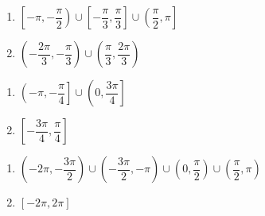 \documentclass{ximera}
\begin{document}
\begin{multicols}{2}

\begin{enumerate}

\setcounter{enumi}{\value{HW}}

\item $\left[ -\pi, -\dfrac{\pi}{2} \right) \cup \left[ -\dfrac{\pi}{3}, \dfrac{\pi}{3} \right] \cup \left( \dfrac{\pi}{2}, \pi \right]$ 
\item $\left( -\dfrac{2\pi}{3}, -\dfrac{\pi}{3} \right) \cup \left( \dfrac{\pi}{3}, \dfrac{2\pi}{3} \right)$

\setcounter{HW}{\value{enumi}}

\end{enumerate}

\end{multicols}

\begin{multicols}{2}

\begin{enumerate}

\setcounter{enumi}{\value{HW}}

\item $\left( -\pi, -\dfrac{\pi}{4} \right] \cup \left( 0, \dfrac{3\pi}{4} \right]$
\item $\left[ -\dfrac{3\pi}{4}, \dfrac{\pi}{4} \right]$

\setcounter{HW}{\value{enumi}}

\end{enumerate}

\end{multicols}

\begin{multicols}{2}

\begin{enumerate}

\setcounter{enumi}{\value{HW}}

\item \small $\left( -2\pi, -\dfrac{3\pi}{2} \right) \cup \left( -\dfrac{3\pi}{2}, -\pi \right) \cup \left( 0, \dfrac{\pi}{2} \right) \cup \left( \dfrac{\pi}{2}, \pi \right)$ \normalsize
\item  $[-2\pi, 2\pi]$ 

\setcounter{HW}{\value{enumi}}

\end{enumerate}

\end{multicols}
\end{document}
